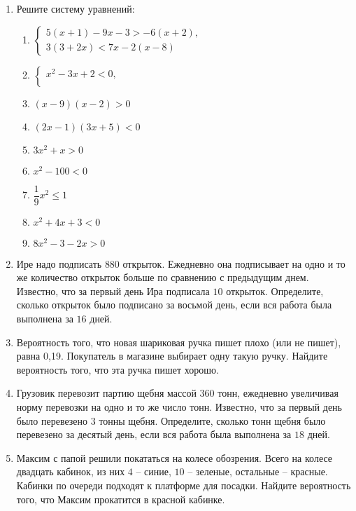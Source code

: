 \documentclass[10pt, a4paper]{article}
\begin{document}
	
	\begin{enumerate}
		\item \textit{} Решите систему уравнений:
		\begin{multicols}{2}
			\begin{enumerate}[label=\asbuk*)]
				\item $
				\left\{
				\begin{aligned}
					5(x+1)-9x-3>-6(x+2),\\
					3(3+2x)<7x-2(x-8)
				\end{aligned}
				\right.
				$
				\item $
				\left\{
				\begin{aligned}
					x^2-3x+2<0,\\
				\end{aligned}
				\right.
				$
				\item $(x-9)(x-2)>0$
				\item $(2x-1)(3x+5)<0$
				\item $3x^2+x>0$
				\item $x^2-100<0$
				\item $\dfrac{1}{9}x^2\leqslant 1$
				\item $x^2+4x+3<0$
				\item $8x^2-3-2x>0$
			\end{enumerate}
		\end{multicols}
		\item Ире надо подписать $880$ открыток. Ежедневно она подписывает на одно и то же количество открыток больше по сравнению с предыдущим днем. Известно, что за первый день Ира подписала $10$ открыток. Определите, сколько открыток было подписано за восьмой день, если вся работа была выполнена за $16$ дней.
		\item Вероятность того, что новая шариковая ручка пишет плохо (или не пишет), равна 0,19. Покупатель в магазине выбирает одну такую ручку. Найдите вероятность того, что эта ручка пишет хорошо.
		\item Грузовик перевозит партию щебня массой $360$ тонн, ежедневно увеличивая норму перевозки на одно и то же число тонн. Известно, что за первый день было перевезено $3$ тонны щебня. Определите, сколько тонн щебня было перевезено за десятый день, если вся работа была выполнена за $18$ дней.
		\item Максим с папой решили покататься на колесе обозрения. Всего на колесе двадцать кабинок, из них $4$ – синие, $10$ – зеленые, остальные – красные. Кабинки по очереди подходят к платформе для посадки. Найдите вероятность того, что Максим прокатится в красной кабинке.
	\end{enumerate}
\end{document}
